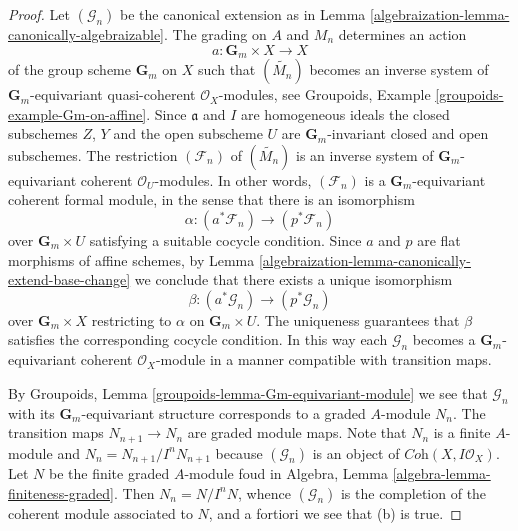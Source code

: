 \begin{proof}

Let $(\mathcal{G}_n)$ be the canonical extension as in
Lemma \ref{algebraization-lemma-canonically-algebraizable}.
The grading on $A$ and $M_n$ determines an action
$$
a : \mathbf{G}_m \times X \longrightarrow X
$$
of the group scheme $\mathbf{G}_m$ on $X$ such that
$(\widetilde{M_n})$ becomes an inverse system of
$\mathbf{G}_m$-equivariant quasi-coherent $\mathcal{O}_X$-modules, see
Groupoids, Example \ref{groupoids-example-Gm-on-affine}.
Since $\mathfrak a$ and $I$ are homogeneous ideals
the closed subschemes $Z$, $Y$ and the open subscheme $U$
are $\mathbf{G}_m$-invariant closed and open subschemes.
The restriction $(\mathcal{F}_n)$ of $(\widetilde{M_n})$
is an inverse system of $\mathbf{G}_m$-equivariant
coherent $\mathcal{O}_U$-modules. In other words, $(\mathcal{F}_n)$
is a $\mathbf{G}_m$-equivariant coherent formal module,
in the sense that there is an isomorphism
$$
\alpha : (a^*\mathcal{F}_n) \longrightarrow (p^*\mathcal{F}_n)
$$
over $\mathbf{G}_m \times U$ satisfying a suitable cocycle condition.
Since $a$ and $p$ are flat morphisms of affine schemes,
by Lemma \ref{algebraization-lemma-canonically-extend-base-change}
we conclude that there exists a unique isomorphism
$$
\beta : (a^*\mathcal{G}_n) \longrightarrow (p^*\mathcal{G}_n)
$$
over $\mathbf{G}_m \times X$ restricting to $\alpha$ on
$\mathbf{G}_m \times U$. The uniqueness guarantees that
$\beta$ satisfies the corresponding cocycle condition.
In this way each $\mathcal{G}_n$ becomes
a $\mathbf{G}_m$-equivariant coherent $\mathcal{O}_X$-module
in a manner compatible with transition maps.

\medskip\noindent
By Groupoids, Lemma \ref{groupoids-lemma-Gm-equivariant-module}
we see that $\mathcal{G}_n$ with its $\mathbf{G}_m$-equivariant
structure corresponds to a graded $A$-module $N_n$. The transition maps
$N_{n + 1} \to N_n$ are graded module maps. Note that $N_n$ is a finite
$A$-module and $N_n = N_{n + 1}/I^n N_{n + 1}$ because
$(\mathcal{G}_n)$ is an object of $\textit{Coh}(X, I\mathcal{O}_X)$.
Let $N$ be the finite graded $A$-module foud in
Algebra, Lemma \ref{algebra-lemma-finiteness-graded}.
Then $N_n = N/I^nN$, whence $(\mathcal{G}_n)$
is the completion of the coherent module
associated to $N$, and a fortiori we see that (b) is true.


\end{proof}

